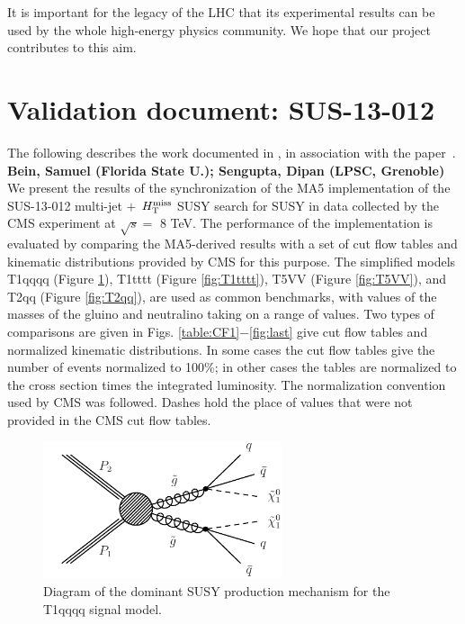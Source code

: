 It is important for the legacy of the LHC that its experimental results can be used by the whole high-energy physics community. We hope that our project contributes to this aim. 

\section{Validation document: SUS-13-012}
\label{app:ma5multijet}
The following describes the work documented in \cite{MA5-CMS-SUS-13-012}, in association with the paper~\cite{MA5-CMS-SUS-13-012}.
\textbf{Bein, Samuel (Florida State U.); Sengupta, Dipan (LPSC, Grenoble)}\\
We present the results of the synchronization of the MA5
implementation of the SUS-13-012 multi-jet $+$ $H_{\text{T}}^{\rm miss}$ SUSY search for SUSY in data collected 
by the CMS experiment at $\sqrt{s}=$ 8 TeV.  The
performance of the implementation is evaluated by comparing the
MA5-derived results with a set of cut flow tables and kinematic
distributions provided by CMS for this purpose. The simplified models
T1qqqq (Figure \ref{fig:T1qqqq}), T1tttt (Figure \ref{fig:T1tttt}), T5VV (Figure \ref{fig:T5VV}), and T2qq (Figure \ref{fig:T2qq}), are used as common benchmarks, with values of the masses of the
gluino and neutralino taking on a range of values. Two types of
comparisons are given in Figs. \ref{table:CF1}$-$\ref{fig:last} give cut flow tables and normalized
kinematic distributions. In some cases the
cut flow tables give the number of events normalized to 100\%; in
other cases the tables are normalized to the cross section times the
integrated luminosity. The normalization convention used by CMS was
followed. Dashes hold the place of values that were not
provided in the CMS cut flow tables. 

\begin{figure}[h!]
\centering
\includegraphics[width=7cm]{figures/Appendices/Ma5ValidationSUS13012/T1qqqq.pdf}
\caption{Diagram of the dominant SUSY production mechanism
for the T1qqqq signal model.}
\label{fig:T1qqqq}
\end{figure}

